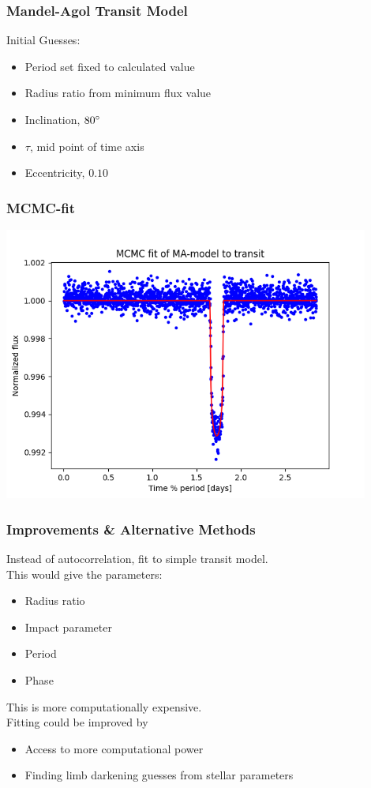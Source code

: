 \documentclass[notes]{beamer}
\begin{document}
\begin{frame}
	\frametitle{Mandel-Agol Transit Model}
	Initial Guesses:
	\begin{itemize}
		\item Period set fixed to calculated value
		\item Radius ratio from minimum flux value
		\item Inclination, $ 80 \degree$
		\item $ \tau $, mid point of time axis
		\item Eccentricity, $ 0.10 $
	\end{itemize}
\end{frame}


\begin{frame}
\frametitle{MCMC-fit}
\centering
\includegraphics[width=0.9\textwidth]{../figures/MCMC_fit0.png}
\end{frame}

\begin{frame}
	\frametitle{Improvements \& Alternative Methods}
	Instead of autocorrelation, fit to simple transit model.\\
	This would give the parameters:
	\begin{itemize}
		\item Radius ratio
		\item Impact parameter
		\item Period
		\item Phase
	\end{itemize}
	This is more computationally expensive.\\
	Fitting could be improved by
	\begin{itemize}
		\item Access to more computational power
		\item Finding limb darkening guesses from stellar parameters
	\end{itemize}
\end{frame}
\end{document}
